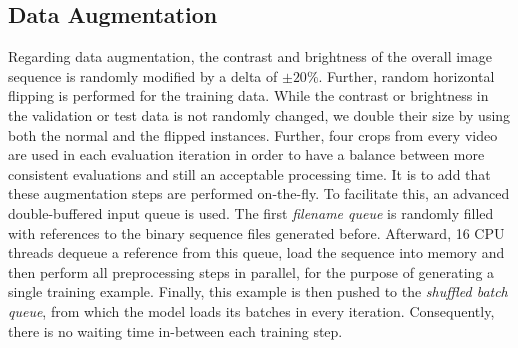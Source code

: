 \subsection{Data Augmentation}

Regarding data augmentation, the contrast and brightness of the overall image sequence is randomly modified by a delta of $ \pm20\% $. Further, random horizontal flipping is performed for the training data. While the contrast or brightness in the validation or test data is not randomly changed, we double their size by using both the normal and the flipped instances. Further, four crops from every video are used in each evaluation iteration in order to have a balance between more consistent evaluations and still an acceptable processing time. It is to add that these augmentation steps are performed on-the-fly. To facilitate this, an advanced double-buffered input queue is used. The first \textit{filename queue} is randomly filled with references to the binary sequence files generated before. Afterward, \num{16} CPU threads dequeue a reference from this queue, load the sequence into memory and then perform all preprocessing steps in parallel, for the purpose of generating a single training example. Finally, this example is then pushed to the \textit{shuffled batch queue}, from which the model loads its batches in every iteration. Consequently, there is no waiting time in-between each training step.
